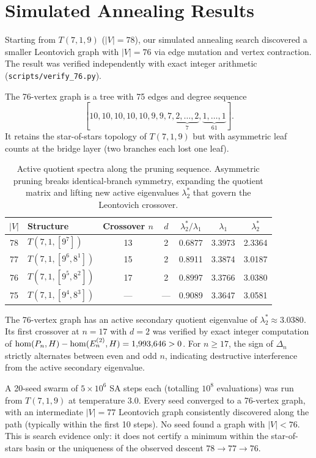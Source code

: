 \section{Simulated Annealing Results}
\label{app:sa}

Starting from $T(7,1,9)$ ($|V|=78$), our simulated annealing
search discovered a smaller Leontovich graph with $|V|=76$ via
edge mutation and vertex contraction.  The result was verified
independently with exact integer arithmetic
(\texttt{scripts/verify\_76.py}).

The 76-vertex graph is a tree with 75 edges and degree sequence
\[
  [10, 10, 10, 10, 10, 9, 9, 7, \underbrace{2, \ldots, 2}_{7},
   \underbrace{1, \ldots, 1}_{61}].
\]
It retains the star-of-stars topology of $T(7,1,9)$ but with
asymmetric leaf counts at the bridge layer (two branches each lost one
leaf).

\begin{table}[H]
\centering
\caption{Active quotient spectra along the pruning sequence. Asymmetric pruning breaks identical-branch symmetry, expanding the quotient matrix and lifting new active eigenvalues $\lambda_2^*$ that govern the Leontovich crossover.}
\label{tab:sa_hits}
\begin{tabular}{@{}clccccc@{}}
  \toprule
  $|V|$ & Structure & Crossover $n$ & $d$ & $\lambda_2^*/\lambda_1$ & $\lambda_1$ & $\lambda_2^*$ \\
  \midrule
  78 & $T(7,1,[9^7])$     & 13  & 2 & 0.6877 & 3.3973 & 2.3364 \\
  77 & $T(7,1,[9^6,8^1])$ & 15  & 2 & 0.8911 & 3.3874 & 3.0187 \\
  76 & $T(7,1,[9^5,8^2])$ & 17  & 2 & 0.8997 & 3.3766 & 3.0380 \\
  \midrule
  75 & $T(7,1,[9^4,8^3])$ & --- & --- & 0.9089 & 3.3647 & 3.0581 \\
  \bottomrule
\end{tabular}
\end{table}

\noindent
The 76-vertex graph has an active secondary quotient eigenvalue of $\lambda_2^* \approx 3.0380$. Its first crossover
at $n = 17$ with $d = 2$ was verified by exact integer computation
of $\mathrm{hom}(P_n, H) - \mathrm{hom}(E_n^{(2)}, H) = 1{,}993{,}646 > 0$.
For $n \ge 17$, the sign of $\Delta_n$ strictly alternates between
even and odd $n$, indicating destructive interference from the
active secondary eigenvalue.

A 20-seed swarm of $5 \times 10^6$ SA steps each (totalling
$10^8$ evaluations) was run from $T(7,1,9)$ at temperature 3.0.
Every seed converged to a 76-vertex graph, with an intermediate
$|V|=77$ Leontovich graph consistently discovered along the path
(typically within the first 10 steps). No seed found a graph with
$|V| < 76$. This is search evidence only: it does not certify a minimum
within the star-of-stars basin or the uniqueness of the observed descent
$78 \to 77 \to 76$.

